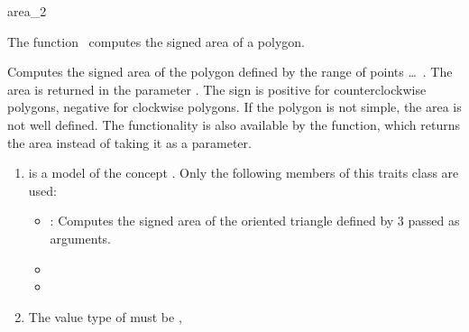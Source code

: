 

\begin{ccRefFunction}{area_2}  %


\ccDefinition
  
The function \ccRefName\ computes the signed area of a polygon.


{
Computes the signed area of the polygon defined by the range of points
 \ldots\ . The area is returned in the parameter
. The sign is positive for counterclockwise polygons, negative for
clockwise polygons. If the polygon is not simple, the area is not well defined.
The functionality is also available by the  function, which
returns the area instead of taking it as a parameter.
}

\begin{enumerate}
    \item {} is a model of the concept 
	  .
	  Only the following members of this traits class are used:
          \begin{itemize}
	    \item {} : Computes the signed area of the
	    oriented triangle defined by 3  passed as arguments.
            \item {}
            \item {}
          \end{itemize}
    \item The value type of  must be ,
\end{enumerate}

\ccSeeAlso

 \\
 \\
 \\
 \\


\end{ccRefFunction}


